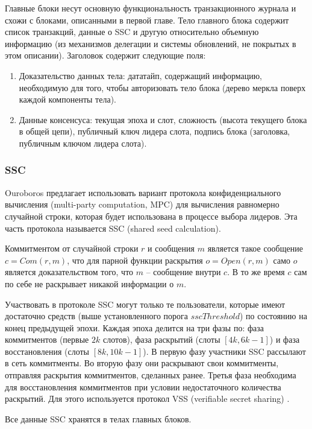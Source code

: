 \documentclass[specification,annotation]{itmo-student-thesis}
\begin{document}
Главные блоки несут основную функциональность транзакционного журнала
и схожи с блоками, описанными в первой главе. Тело главного блока
содержит список транзакций, данные о SSC и другую относительно
объемную информацию (из механизмов делегации и системы обновлений, не
покрытых в этом описании). Заголовок содержит следующие поля:

\begin{enumerate}
\item Доказательство данных тела: дататайп, содержащий информацию,
  необходимую для того, чтобы авторизовать тело блока (дерево меркла
  поверх каждой компоненты тела).
\item Данные консенсуса: текущая эпоха и слот, сложность (высота
  текущего блока в общей цепи), публичный ключ лидера слота, подпись
  блока (заголовка, публичным ключом лидера слота).
\end{enumerate}

\subsubsection{SSC}

Ouroboros предлагает использовать вариант протокола конфиденциального
вычисления (multi-party computation, MPC) для вычисления равномерно
случайной строки, которая будет использована в процессе выбора
лидеров. Эта часть протокола называется SSC (shared seed calculation).

Коммитментом от случайной строки $r$ и сообщения $m$ является такое
сообщение $c = Com(r,m)$, что для парной функции раскрытия $o =
Open(r,m)$ само $o$ является доказательством того, что $m$ --
сообщение внутри $c$. В то же время $c$ сам по себе не раскрывает
никакой информации о $m$.

Участвовать в протоколе SSC могут только те пользователи, которые
имеют достаточно средств (выше установленного порога $sscThreshold$)
по состоянию на конец предыдущей эпохи. Каждая эпоха делится на три
фазы по: фаза коммитментов (первые $2k$ слотов), фаза раскрытий (слоты
$[4k, 6k-1]$) и фаза восстановления (слоты $[8k, 10k-1]$). В
первую фазу участники SSC рассылают в сеть коммитменты. Во вторую фазу
они раскрывают свои коммитменты, отправляя раскрытия коммитментов,
сделанных ранее. Третья фаза необходима для восстановления
коммитментов при условии недостаточного количества раскрытий. Для
этого используется протокол VSS (verifiable secret sharing)
\cite{feldman1987practical}.

Все данные SSC хранятся в телах главных блоков.
\end{document}
